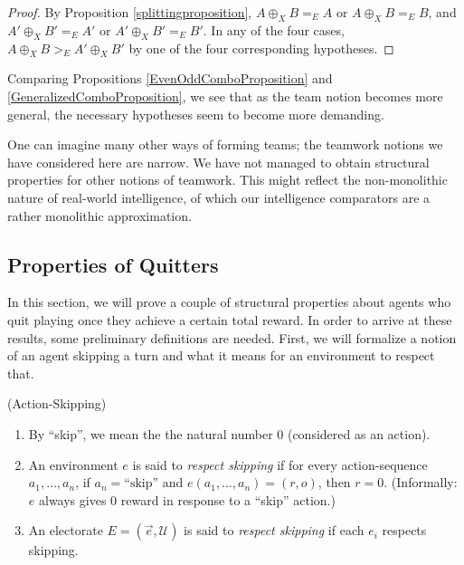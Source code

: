 \documentclass[twoside,11pt]{article}
\begin{document}
\begin{proof}
    By Proposition \ref{splittingproposition},
    $A\oplus_X B =_{E}A$ or $A\oplus_X B =_{E}B$,
    and $A'\oplus_X B' =_{E}A'$ or $A'\oplus_X B' =_{E}B'$.
    In any of the four cases, $A\oplus_X B >_{E} A'\oplus_X B'$
    by one of the four corresponding hypotheses.
\end{proof}

Comparing Propositions \ref{EvenOddComboProposition} and \ref{GeneralizedComboProposition},
we see that as the team notion becomes more general, the necessary hypotheses
seem to become more demanding.

One can imagine many other ways of forming teams; the teamwork notions we have considered
here are narrow. We have not managed to obtain structural properties for other
notions of teamwork. This might reflect the non-monolithic nature of real-world
intelligence, of which our intelligence comparators are a rather monolithic approximation.

\subsection{Properties of Quitters}
\label{quittersSubSection}

In this section, we will prove a couple of structural properties about
agents who quit playing once they achieve a certain total reward. In order to
arrive at these results, some preliminary definitions are needed.
First, we will formalize a notion of an agent skipping a turn and what
it means for an environment to respect that.

\begin{definition}
    (Action-Skipping)
    \begin{enumerate}
        \item
            By ``skip'', we mean the the natural number $0$ (considered as an action).
        \item
            An environment $e$ is said to \emph{respect skipping} if
            for every action-sequence $a_1,\ldots,a_n$, if $a_n=\mbox{``skip''}$
            and $e(a_1,\ldots,a_n)=(r,o)$, then $r=0$.
            (Informally: $e$ always gives $0$ reward in response to a ``skip''
            action.)
        \item
            An electorate $E=(\vec{e},\mathscr U)$ is said to \emph{respect skipping}
            if each $e_i$ respects skipping.
    \end{enumerate}
\end{definition}
\end{document}
